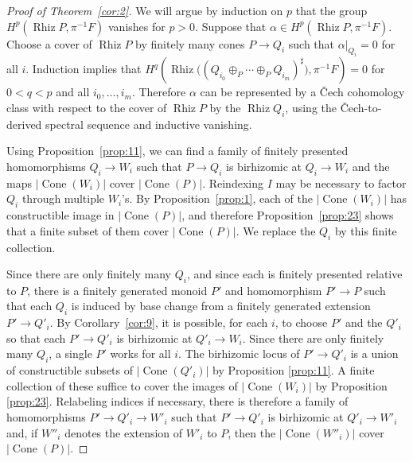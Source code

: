 \documentclass[10pt]{article}
\numberwithin{equation}{section}
\theoremstyle{definition}
\theoremstyle{remark}
\def\Cone{\operatorname{Cone}}
\def\Rh{\operatorname{Rhiz}}
\begin{document}
\begin{proof}[Proof of Theorem~\ref{cor:2}]
	We will argue by induction on $p$ that the group $H^p(\Rh P, \pi^{-1} F)$ vanishes for $p > 0$.  Suppose that $\alpha \in H^p(\Rh P, \pi^{-1} F)$.  Choose a cover of $\Rh P$ by finitely many cones $P \to Q_i$ such that $\alpha \big|_{Q_i} = 0$ for all $i$.  Induction implies that $H^q(\Rh\bigl( ( Q_{i_0} \oplus_P \cdots \oplus_P Q_{i_m})^\sharp \bigr), \pi^{-1} F) = 0$ for $0 < q < p$ and all $i_0, \ldots, i_m$.  Therefore $\alpha$ can be represented by a \v Cech cohomology class with respect to the cover of $\Rh P$ by the $\Rh Q_i$, using the \v Cech-to-derived spectral sequence and inductive vanishing. 





	Using Proposition~\ref{prop:11}, we can find a family of finitely presented homomorphisms $Q_i \to W_i$ such that $P \to Q_i$ is birhizomic at $Q_i \to W_i$ and the maps $\lvert\Cone(W_i)\rvert$ cover $\lvert\Cone(P)\rvert$. Reindexing $I$ may be necessary to factor $Q_i$ through multiple $W_i$'s.  By Proposition~\ref{prop:1}, each of the $\lvert\Cone(W_i)\rvert$ has constructible image in $\lvert\Cone(P)\rvert$, and therefore Proposition~\ref{prop:23} shows that a finite subset of them cover $\lvert\Cone(P)\rvert$.  We replace the $Q_i$ by this finite collection.




	Since there are only finitely many $Q_i$, and since each is finitely presented relative to $P$, there is a finitely generated monoid $P'$ and homomorphism $P' \to P$ such that each $Q_i$ is induced by base change from a finitely generated extension $P' \to Q'_i$.  By Corollary~\ref{cor:9}, it is possible, for each $i$, to choose $P'$ and the $Q'_i$ so that each $P' \to Q'_i$ is birhizomic at $Q'_i \to W_i$.  Since there are only finitely many $Q_i$, a single $P'$ works for all $i$.  The birhizomic locus of $P' \to Q'_i$ is a union of constructible subsets of $\lvert\Cone(Q'_i)\rvert$ by Proposition \ref{prop:11}. A finite collection of these suffice to cover the images of $\lvert \Cone(W_i)\rvert$ by Proposition \ref{prop:23}.  Relabeling indices if necessary, there is therefore a family of homomorphisms $P' \to Q'_i \to W'_i$ such that $P' \to Q'_i$ is birhizomic at $Q'_i \to W'_i$ and, if $W''_i$ denotes the extension of $W'_i$ to $P$, then the $\lvert\Cone(W''_i)\rvert$ cover $\lvert\Cone(P)\rvert$.  



	
	


\end{proof}
\end{document}
